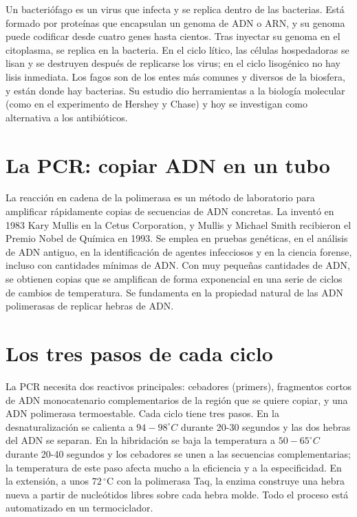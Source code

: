 \documentclass{book}
\begin{document}
Un bacteriófago es un virus que infecta y se replica dentro de las bacterias. Está formado por proteínas que encapsulan un genoma de ADN o ARN, y su genoma puede codificar desde cuatro genes hasta cientos. Tras inyectar su genoma en el citoplasma, se replica en la bacteria. En el ciclo lítico, las células hospedadoras se lisan y se destruyen después de replicarse los virus; en el ciclo lisogénico no hay lisis inmediata. Los fagos son de los entes más comunes y diversos de la biosfera, y están donde hay bacterias. Su estudio dio herramientas a la biología molecular (como en el experimento de Hershey y Chase) y hoy se investigan como alternativa a los antibióticos.


\section{La PCR: copiar ADN en un tubo}

La reacción en cadena de la polimerasa es un método de laboratorio para amplificar rápidamente copias de secuencias de ADN concretas. La inventó en 1983 Kary Mullis en la Cetus Corporation, y Mullis y Michael Smith recibieron el Premio Nobel de Química en 1993. Se emplea en pruebas genéticas, en el análisis de ADN antiguo, en la identificación de agentes infecciosos y en la ciencia forense, incluso con cantidades mínimas de ADN. Con muy pequeñas cantidades de ADN, se obtienen copias que se amplifican de forma exponencial en una serie de ciclos de cambios de temperatura. Se fundamenta en la propiedad natural de las ADN polimerasas de replicar hebras de ADN.


\section{Los tres pasos de cada ciclo}

La PCR necesita dos reactivos principales: cebadores (primers), fragmentos cortos de ADN monocatenario complementarios de la región que se quiere copiar, y una ADN polimerasa termoestable. Cada ciclo tiene tres pasos. En la desnaturalización se calienta a \(94-98 ^{\circ}C\) durante 20-30 segundos y las dos hebras del ADN se separan. En la hibridación se baja la temperatura a \(50-65 ^{\circ}C\) durante 20-40 segundos y los cebadores se unen a las secuencias complementarias; la temperatura de este paso afecta mucho a la eficiencia y a la especificidad. En la extensión, a unos \(72\,{}^{\circ}\mathrm{C}\) con la polimerasa Taq, la enzima construye una hebra nueva a partir de nucleótidos libres sobre cada hebra molde. Todo el proceso está automatizado en un termociclador.
\end{document}
